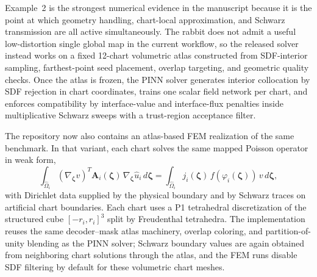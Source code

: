 \documentclass[sort&compress]{svjour3} %
\begin{document}
Example~2 is the strongest numerical evidence in the manuscript because it is the point at which geometry handling, chart-local approximation, and Schwarz transmission are all active simultaneously. The rabbit does not admit a useful low-distortion single global map in the current workflow, so the released solver instead works on a fixed 12-chart volumetric atlas constructed from SDF-interior sampling, farthest-point seed placement, overlap targeting, and geometric quality checks. Once the atlas is frozen, the PINN solver generates interior collocation by SDF rejection in chart coordinates, trains one scalar field network per chart, and enforces compatibility by interface-value and interface-flux penalties inside multiplicative Schwarz sweeps with a trust-region acceptance filter.

The repository now also contains an atlas-based FEM realization of the same benchmark. In that variant, each chart solves the same mapped Poisson operator in weak form,
\[
\int_{\widehat{\Omega}_i} (\nabla_{\boldsymbol{\zeta}} v)^T
\mathbf{A}_i(\boldsymbol{\zeta})\,
\nabla_{\boldsymbol{\zeta}} \widehat{u}_i
\,d\boldsymbol{\zeta}
=
\int_{\widehat{\Omega}_i}
j_i(\boldsymbol{\zeta})\,f(\varphi_i(\boldsymbol{\zeta}))\,v
\,d\boldsymbol{\zeta},
\]
with Dirichlet data supplied by the physical boundary and by Schwarz traces on artificial chart boundaries. Each chart uses a P1 tetrahedral discretization of the structured cube $[-r_i,r_i]^3$ split by Freudenthal tetrahedra. The implementation reuses the same decoder--mask atlas machinery, overlap coloring, and partition-of-unity blending as the PINN solver; Schwarz boundary values are again obtained from neighboring chart solutions through the atlas, and the FEM runs disable SDF filtering by default for these volumetric chart meshes.
\end{document}
